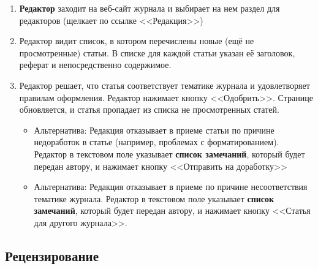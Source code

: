 \begin{enumerate}
\item
  \textbf{Редактор} заходит на веб-сайт журнала и выбирает на нем раздел для редакторов (щелкает по ссылке <<Редакция>>)
\item
  Редактор видит список, в котором перечислены новые (ещё не просмотренные) статьи. В списке для каждой статьи указан её заголовок, реферат и непосредственно содержимое.
\item Редактор решает, что статья соответствует тематике журнала и удовлетворяет правилам оформления. Редактор нажимает кнопку <<Одобрить>>. Странице обновляется, и статья пропадает из списка не просмотренных статей.
  \begin{itemize}
  \item
    Альтернатива: Редакция отказывает в приеме статьи по причине недоработок в статье (например, проблемах с форматированием). Редактор в текстовом поле указывает \textbf{список замечаний}, который будет передан автору, и нажимает кнопку <<Отправить на доработку>>
  \item
    Альтернатива: Редакция отказывает в приеме по причине несоответствия тематике журнала. Редактор в текстовом поле указывает \textbf{список замечаний}, который будет передан автору, и нажимает кнопку <<Статья для другого журнала>>.
  \end{itemize}
\end{enumerate}

\subsection{Рецензирование}

